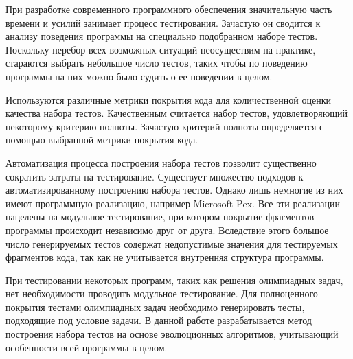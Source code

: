 \startprefacepage


При разработке современного программного обеспечения значительную часть времени и усилий занимает процесс тестирования. Зачастую он сводится к анализу поведения 
программы на специально подобранном наборе тестов. Поскольку перебор всех возможных ситуаций неосуществим на практике, стараются выбрать небольшое число 
тестов, таких чтобы по поведению программы на них можно было судить о ее поведении в целом.

Используются различные метрики покрытия кода для количественной оценки качества набора тестов. Качественным считается набор тестов, удовлетворяющий некоторому 
критерию полноты. Зачастую критерий полноты определяется с помощью выбранной метрики покрытия кода.

Автоматизация процесса построения набора тестов позволит существенно сократить затраты на тестирование. Существует множество подходов к автоматизированному 
построению набора тестов. Однако лишь немногие из них имеют программную реализацию, например $\text{Microsoft Pex}$. Все эти реализации нацелены на модульное 
тестирование, при котором покрытие фрагментов программы происходит независимо друг от друга. Вследствие этого большое число генерируемых тестов содержат 
недопустимые значения для тестируемых фрагментов кода, так как не учитывается внутренняя структура программы. 

При тестировании некоторых программ, таких как решения олимпиадных задач, нет необходимости проводить модульное тестирование. Для полноценного покрытия тестами 
олимпиадных задач необходимо генерировать тесты, подходящие под условие задачи. В данной работе разрабатывается метод построения набора тестов на основе 
эволюционных алгоритмов, учитывающий особенности всей программы в целом. 